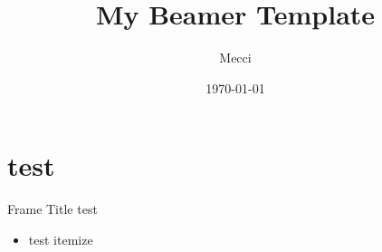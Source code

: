 \documentclass[aspectratio=169,xcolor=x11names,compress]{ctexbeamer}
\title{My Beamer Template}
\author{Mecci}
\date{\today}
\begin{document}
\maketitle

\section{test}
\begin{frame}{Frame Title}
    test

\begin{itemize}
    \item test itemize
\end{itemize}

\end{frame}
\end{document}
